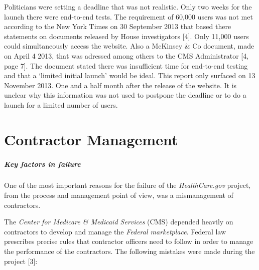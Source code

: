 \documentclass[]{article}
\let\oldsubparagraph\subparagraph
\renewcommand{\subparagraph}[1]{\oldsubparagraph{#1}\mbox{}}
\begin{document}
Politicians were setting a deadline that was not realistic. Only two
weeks for the launch there were end-to-end tests. The requirement of
60,000 users was not met according to the New York Times on 30 September
2013 that based there statements on documents released by House
investigators {[}4{]}. Only 11,000 users could simultaneously access the
website. Also a McKinsey \& Co document, made on April 4 2013, that was
adressed among others to the CMS Administrator {[}4, page 7{]}. The
document stated there was insufficient time for end-to-end testing and
that a `limited initial launch' would be ideal. This report only
surfaced on 13 November 2013. One and a half month after the release of
the website. It is unclear why this information was not used to postpone
the deadline or to do a launch for a limited number of users.

\section{Contractor Management}\label{contractor-management}

\subparagraph{Key factors in failure}\label{key-factors-in-failure}

One of the most important reasons for the failure of the
\emph{HealthCare.gov} project, from the process and management point of
view, was a mismanagement of contractors.

The \emph{Center for Medicare \& Medicaid Services} (CMS) depended
heavily on contractors to develop and manage the \emph{Federal
marketplace}. Federal law prescribes precise rules that contractor
officers need to follow in order to manage the performance of the
contractors. The following mistakes were made during the project
{[}3{]}:
\end{document}
